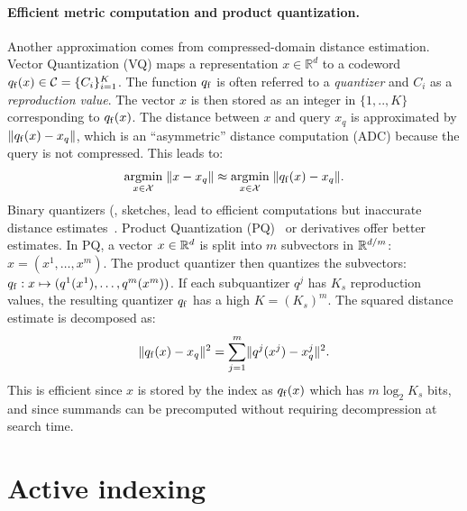 \paragraph{Efficient metric computation and product quantization.} 
Another approximation comes from compressed-domain distance estimation. 
Vector Quantization (VQ) maps a representation $x \in \mathbb{R}^d$ to a codeword $q_\mathrm{f}(x) \in \mathcal{C} = \{C_i\}_{i=1}^{K}$.
The function $q_\mathrm{f}$ is often referred to a \emph{quantizer} and $C_i$ as a \emph{reproduction value}.
The vector $x$ is then stored as an integer in $\{1, .., K\}$ corresponding to $q_\mathrm{f}(x)$.
The distance between $x$ and query $x_q$ is approximated by $\lVert{q_\mathrm{f}(x) - x_q}\rVert$, which is an ``asymmetric'' distance computation (ADC) because the query is not compressed. 
This leads to: 
\begin{align}
    \mathop{\mathrm{argmin}}_{x \in \mathcal X} \;  \lVert{x-x_q}\rVert  
    \approx 
    \mathop{\mathrm{argmin}}_{x \in \mathcal X} \;  \lVert{q_\mathrm{f}(x)- x_q}\rVert . 
\end{align}
Binary quantizers (\aka, sketches, \citep{charikar2002similarity} lead to efficient computations but inaccurate distance estimates~\citep{weiss2008spectral}.
Product Quantization (PQ)~\citep{jegou2010pq} or derivatives \citep{ge2013optimized} offer better estimates.
In PQ, a vector $x\in \mathbb{R}^d$ is split into $m$ subvectors in $\mathbb{R}^{d/m}$: $x=(x^1, \ldots, x^m)$.
The product quantizer then quantizes the subvectors: $q_\mathrm{f}: x \mapsto (q^1(x^1), \ldots, q^m(x^m))$. 
If each subquantizer $q^j$ has $K_s$ reproduction values, the resulting quantizer $q_\mathrm{f}$ has a high  $K=(K_s)^m$. 
The squared distance estimate is decomposed as:
\begin{align}
    \lVert{q_\mathrm{f}(x)-x_q}\rVert^2 = \sum_{j=1}^m \lVert{q^j(x^j)-x_q^j}\rVert^2.
\end{align}
This is efficient since $x$ is stored by the index as $q_\mathrm{f} (x)$ which has $m\log_2 K_s$ bits, and since summands can be precomputed without requiring decompression at search time.













\section{Active indexing}\label{section:method}

